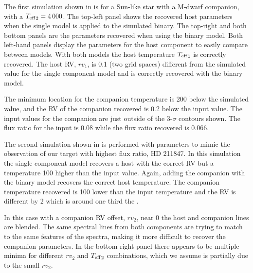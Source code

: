 The first simulation shown in  is for a Sun-like star with a M-dwarf companion, with a \({T_{\mathrm{eff}}}_{2} =4\,000\)\K{}. The top-left panel shows the recovered host parameters when the single model is applied to the simulated binary. The top-right and both bottom panels are the parameters recovered when using the binary model. Both left-hand panels display the parameters for the host component to easily compare between models. With both models the host temperature \({T_{\mathrm{eff}}}_{1}\) is correctly recovered. The host {RV}, \({rv}_1\), is 0.1\kmps{} (two grid spaces) different from the simulated value for the single component model and is correctly recovered with the binary model.

The minimum \textchisquared{} location for the companion temperature is 200\K{} below the simulated value, and the {RV} of the companion recovered is 0.2\kmps{} below the input value. The input values for the companion are just outside of the 3-\(\sigma\) contours shown. The flux ratio for the input is 0.08 while the flux ratio recovered is 0.066.

The second simulation shown in  is performed with parameters to mimic the observation of our target with highest flux ratio, {HD 211847}. In this simulation the single component model recovers a host with the correct {RV} but a temperature 100\K{} higher than the input value. Again, adding the companion with the binary model recovers the correct host temperature. The companion temperature recovered is 100\K{} lower than the input temperature and the {RV} is different by 2\kmps{} which is around one third the {\fwhm}.

In this case with a companion {RV} offset, \({rv}_2\), near 0\kmps{} the host and companion lines are blended. The same spectral lines from both components are trying to match to the same features of the spectra, making it more difficult to recover the companion parameters. In the bottom right panel there appears to be multiple minima for different \({rv}_2\) and \({T_{\mathrm{eff}}}_{2}\) combinations, which we assume is partially due to the small \({rv}_2\).

